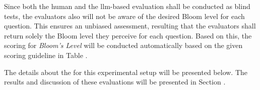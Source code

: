 Since both the human and the \ac{llm}-based evaluation shall be conducted as blind tests, the evaluators also will not be aware of the desired Bloom level for each question. This ensures an unbiased assessment, resulting that the evaluators shall return solely the Bloom level they perceive for each question. Based on this, the scoring for \textit{Bloom's Level} will be conducted automatically based on the given scoring guideline in Table .

The details about the  for this experimental setup will be presented below. The results and discussion of these evaluations will be presented in Section .